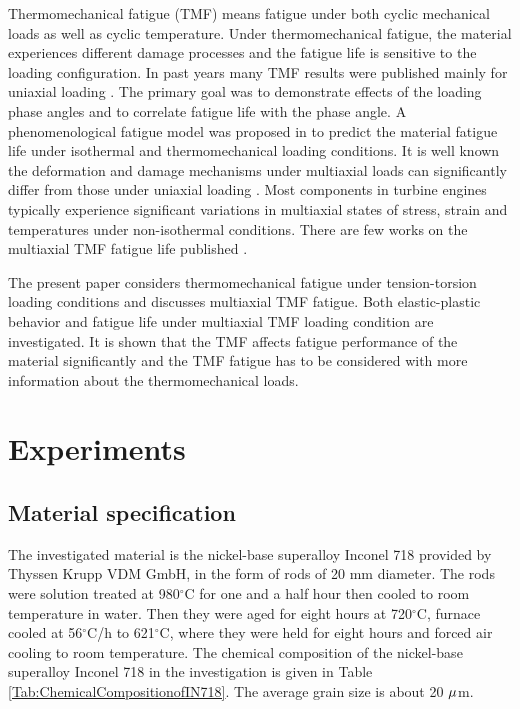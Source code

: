 \documentclass[preprint,5p,twocolumn,11pt,sort&compress]{elsarticle}
\begin{document}
Thermomechanical fatigue (TMF) means fatigue under both cyclic mechanical loads as well as cyclic temperature. Under thermomechanical fatigue, the material experiences different damage processes and the fatigue life is sensitive to the loading configuration. In past years many TMF results were published mainly for uniaxial loading \cite{Evans2008, Kulawinski2015, Remy2003, Bauer2009}. The primary goal was to demonstrate effects of the loading phase angles and to correlate fatigue life with the phase angle. A phenomenological fatigue model was proposed in \cite{Vose2013} to predict the material fatigue life under isothermal and thermomechanical loading conditions. It is well known the deformation and damage mechanisms under multiaxial loads can significantly differ from those under uniaxial loading \cite{Fang2015, Kang2004, Chen2004}. Most components in turbine engines typically experience significant variations in multiaxial states of stress, strain and temperatures under non-isothermal conditions. There are few works on the multiaxial TMF fatigue life published \cite{Brookes2010}.

The present paper considers thermomechanical fatigue under tension-torsion loading conditions and discusses multiaxial TMF fatigue. Both elastic-plastic behavior and fatigue life under multiaxial TMF loading condition are investigated. It is shown that the TMF affects fatigue performance of the material significantly and the TMF fatigue has to be considered with more information about the thermomechanical loads.

\section{Experiments}
\subsection{Material specification}
The investigated material is the nickel-base superalloy Inconel 718 provided by Thyssen Krupp VDM GmbH, in the form of rods of 20 mm diameter.
The rods were solution treated at 980$^{\circ}$C for one and a half hour then cooled to room temperature in water.
Then they were aged for eight hours at 720$^{\circ}$C, furnace cooled at 56$^{\circ}$C/h to 621$^{\circ}$C, where they were held for eight hours and forced air cooling to room temperature.
The chemical composition of the nickel-base superalloy Inconel 718 in the investigation is given in Table \ref{Tab:ChemicalCompositionofIN718}.
The average grain size is about 20 $\rm{\mu }$m.
\end{document}
